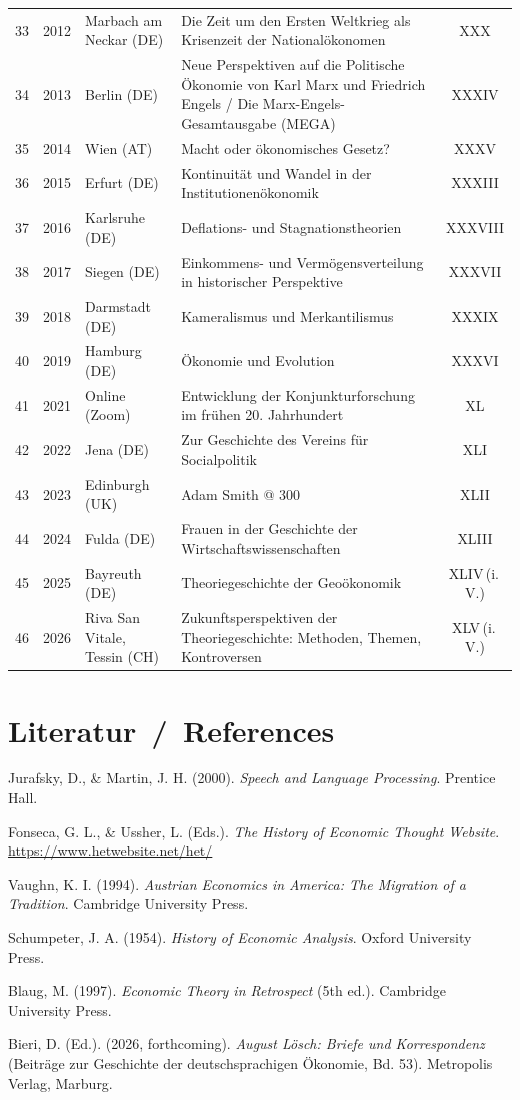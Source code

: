 \documentclass[11pt,a4paper,twoside]{article}
\begin{document}
\begin{longtable}{@{}r c L{3.0cm} L{6.7cm} c@{}}
33 & 2012 & Marbach am Neckar (DE) & Die Zeit um den Ersten Weltkrieg als Krisenzeit der Nationalökonomen & XXX\\
34 & 2013 & Berlin (DE) & Neue Perspektiven auf die Politische Ökonomie von Karl Marx und Friedrich Engels / Die Marx-Engels-Gesamtausgabe (MEGA) & XXXIV\\
35 & 2014 & Wien (AT) & Macht oder ökonomisches Gesetz? & XXXV\\
36 & 2015 & Erfurt (DE) & Kontinuität und Wandel in der Institutionenökonomik & XXXIII\\
37 & 2016 & Karlsruhe (DE) & Deflations- und Stagnationstheorien & XXXVIII\\
38 & 2017 & Siegen (DE) & Einkommens- und Vermögensverteilung in historischer Perspektive & XXXVII\\
39 & 2018 & Darmstadt (DE) & Kameralismus und Merkantilismus & XXXIX\\
40 & 2019 & Hamburg (DE) & Ökonomie und Evolution & XXXVI\\
41 & 2021 & Online (Zoom) & Entwicklung der Konjunkturforschung im frühen 20. Jahrhundert & XL\\
42 & 2022 & Jena (DE) & Zur Geschichte des Vereins für Socialpolitik & XLI\\
43 & 2023 & Edinburgh (UK) & Adam Smith @ 300 & XLII\\
44 & 2024 & Fulda (DE) & Frauen in der Geschichte der Wirtschaftswissenschaften & XLIII\\
45 & 2025 & Bayreuth (DE) & Theoriegeschichte der Geoökonomik & XLIV\,(i.\,V.)\\
46 & 2026 & Riva San Vitale, Tessin (CH) & Zukunftsperspektiven der Theoriegeschichte: Methoden, Themen, Kontroversen & XLV\,(i.\,V.)\\
\end{longtable}
\endgroup

\section{Literatur \,/\, References}
\begin{thebibliography}{9}
Jurafsky, D., \& Martin, J. H. (2000). \textit{Speech and Language Processing}. Prentice Hall.

Fonseca, G. L., \& Ussher, L. (Eds.). \textit{The History of Economic Thought Website}. \url{https://www.hetwebsite.net/het/}

Vaughn, K. I. (1994). \textit{Austrian Economics in America: The Migration of a Tradition}. Cambridge University Press.

Schumpeter, J. A. (1954). \textit{History of Economic Analysis}. Oxford University Press.

Blaug, M. (1997). \textit{Economic Theory in Retrospect} (5th ed.). Cambridge University Press.

Bieri, D. (Ed.). (2026, forthcoming). \textit{August Lösch: Briefe und Korrespondenz} (Beiträge zur Geschichte der deutschsprachigen Ökonomie, Bd. 53). Metropolis Verlag, Marburg.
\end{thebibliography}
\end{document}
